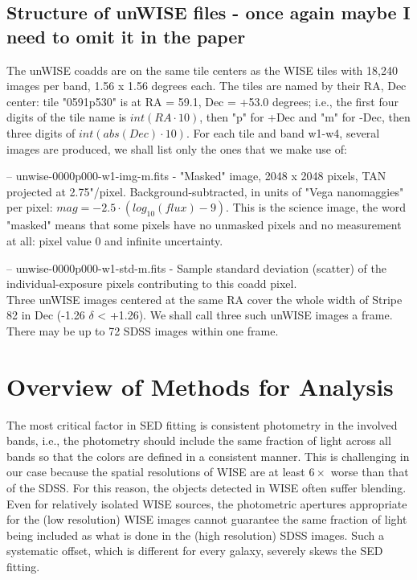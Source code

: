 \documentclass[numberedappendix,apj,twocolumn]{emulateapj}
\begin{document}
\subsection{Structure of unWISE files - once again maybe I need to omit it in the paper}

The unWISE coadds are on the same tile centers as the WISE tiles with 18,240 images per band, 1.56 x 1.56 degrees each. The tiles are named by their RA, Dec center: tile "0591p530" is at RA = 59.1, Dec = +53.0 degrees; i.e., the first four digits of the tile name is $int(RA \cdot 10)$, then "p" for +Dec and "m" for -Dec, then three digits of $int(abs(Dec)\cdot 10)$. For each tile and band w1-w4, several images are produced, we shall list only the ones that we make use of:

-- unwise-0000p000-w1-img-m.fits - "Masked" image, 2048 x 2048 pixels, TAN projected at 2.75"/pixel. Background-subtracted, in units of "Vega nanomaggies" per pixel: $mag = -2.5 \cdot (log_{10}(flux) - 9)$. This is the science image, the word "masked" means that some pixels have no unmasked pixels and no measurement at all: pixel value 0 and infinite uncertainty.

-- unwise-0000p000-w1-std-m.fits - Sample standard deviation (scatter) of the individual-exposure pixels  contributing to this coadd pixel.\\

Three unWISE images centered at the same RA cover the whole width of Stripe 82 in Dec (-1.26 $\delta$ < +1.26). We shall call three such unWISE images a frame. There may be up to 72 SDSS images within one frame.

\section{Overview of Methods for Analysis}


The most critical factor in SED fitting is consistent photometry in the involved bands, i.e., the photometry should include the same fraction of light across all bands so that the colors are defined in a consistent manner. This is challenging in our case because the spatial resolutions of WISE are at least $6\times$ worse than that of the SDSS. For this reason, the objects detected in WISE often suffer blending. Even for relatively isolated WISE sources, the photometric apertures appropriate for the (low resolution) WISE images cannot guarantee the same fraction of light being included as what is done in the (high resolution) SDSS images. Such a systematic offset, which is different for every galaxy, severely skews the SED fitting. 
\end{document}
